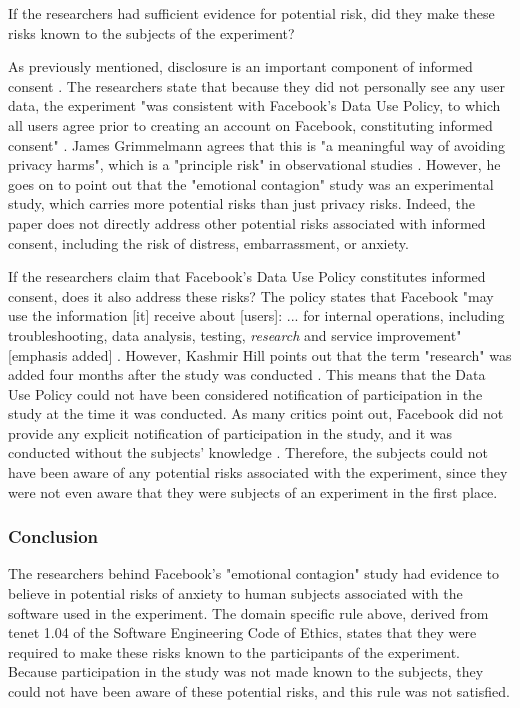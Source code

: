 	If the researchers had sufficient evidence for potential risk, did they make these risks known to the subjects of the experiment? \par
	As previously mentioned, disclosure is an important component of informed consent \cite{irb-informed-consent}.  The researchers state that because they did not personally see any user data, the experiment "was consistent with Facebook’s Data Use Policy, to which all users agree prior to creating an account on Facebook, constituting informed consent" \cite{study}.  James Grimmelmann agrees that this is "a meaningful way of avoiding privacy harms", which is a "principle risk" in observational studies \cite{laboratorium}.  However, he goes on to point out that the "emotional contagion" study was an experimental study, which carries more potential risks than just privacy risks.  Indeed, the paper does not directly address other potential risks associated with informed consent, including the risk of distress, embarrassment, or anxiety. \par
	If the researchers claim that Facebook's Data Use Policy constitutes informed consent, does it also address these risks?  The policy states that Facebook "may use the information [it] receive about [users]: ... for internal operations, including troubleshooting, data analysis, testing, \textit{research} and service improvement" [emphasis added] \cite{leeper}.  However, Kashmir Hill points out that the term "research" was added four months after the study was conducted \cite{forbes}.  This means that the Data Use Policy could not have been considered notification of participation in the study at the time it was conducted.  As many critics point out, Facebook did not provide any explicit notification of participation in the study, and it was conducted without the subjects' knowledge \cite{atlantic} \cite{forbes} \cite{leeper} \cite{slate}.  Therefore, the subjects could not have been aware of any potential risks associated with the experiment, since they were not even aware that they were subjects of an experiment in the first place.

	\subsubsection{Conclusion}
	The researchers behind Facebook's "emotional contagion" study had evidence to believe in potential risks of anxiety to human subjects associated with the software used in the experiment.  The domain specific rule above, derived from tenet 1.04 of the Software Engineering Code of Ethics, states that they were required to make these risks known to the participants of the experiment.  Because participation in the study was not made known to the subjects, they could not have been aware of these potential risks, and this rule was not satisfied.
	\vspace{0.2cm}
